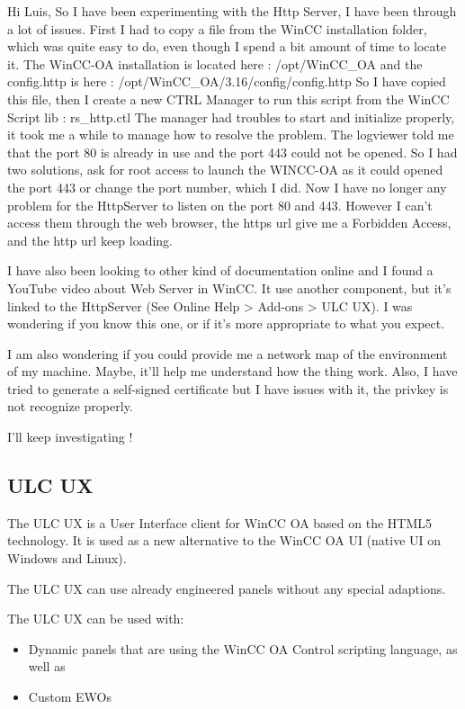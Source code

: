 \documentclass[a4paper, 10pt]{article}
\begin{document}
Hi Luis,
So I have been experimenting with the Http Server, I have been through a lot of issues.
First I had to copy a file from the WinCC installation folder, which was quite easy to do, even though I spend a bit amount of time to locate it.
The WinCC-OA installation is located here : /opt/WinCC\_OA and the config.http is here : /opt/WinCC\_OA/3.16/config/config.http
So I have copied this file, then I create a new CTRL Manager to run this script from the WinCC Script lib : rs\_http.ctl
The manager had troubles to start and initialize properly, it took me a while to manage how to resolve the problem.
The logviewer told me that the port 80 is already in use and the port 443 could not be opened.
So I had two solutions, ask for root access to launch the WINCC-OA as it could opened the port 443 or change the port number, which I did.
Now I have no longer any problem for the HttpServer to listen on the port 80 and 443.
However I can't access them through the web browser, the https url give me a Forbidden Access, and the http url keep loading.

I have also been looking to other kind of documentation online and I found a YouTube video about Web Server in WinCC. 
It use another component, but it's linked to the HttpServer (See Online Help > Add-ons > ULC UX).
I was wondering if you know this one, or if it's more appropriate to what you expect.

I am also wondering if you could provide me a network map of the environment of my machine. Maybe, it'll help me understand how the thing work.
Also, I have tried to generate a self-signed certificate but I have issues with it, the privkey is not recognize properly.

I'll keep investigating !

\subsection{ULC UX}
The ULC UX is a User Interface client for WinCC OA based on the HTML5 technology. It is used as a new alternative to the WinCC OA UI (native UI on Windows and Linux).

The ULC UX can use already engineered panels without any special adaptions.

The ULC UX can be used with:
\begin{itemize}
    \item Dynamic panels that are using the WinCC OA Control scripting language, as well as
    \item Custom EWOs
\end{itemize}
\end{document}
